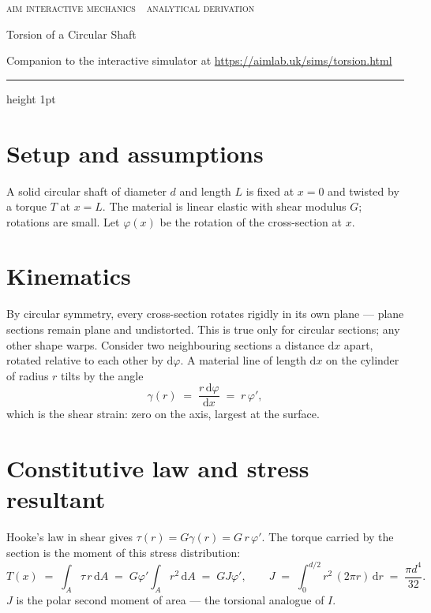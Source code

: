 \documentclass[10pt,a4paper]{article}
\begin{document}
{\footnotesize\textcolor{celdark}{\textsc{aim interactive mechanics \,\textperiodcentered\, analytical derivation}}}

{\LARGE Torsion of a Circular Shaft}

\textcolor{celdark}{\small Companion to the interactive simulator at
\url{https://aimlab.uk/sims/torsion.html}}

\medskip
{\color{celline}\hrule height 1pt}

\section*{Setup and assumptions}
A solid circular shaft of diameter $d$ and length $L$ is fixed at $x = 0$ and
twisted by a torque $T$ at $x = L$. The material is linear elastic with shear
modulus $G$; rotations are small. Let $\varphi(x)$ be the rotation of the
cross-section at $x$.

\section*{Kinematics}
By circular symmetry, every cross-section rotates rigidly in its own plane ---
plane sections remain plane and undistorted. This is true only for circular sections;
any other shape warps. Consider two neighbouring sections a distance
$\mathrm{d}x$ apart, rotated relative to each other by $\mathrm{d}\varphi$.
A material line of length $\mathrm{d}x$ on the cylinder of radius $r$ tilts by
the angle
\begin{equation}
\gamma(r) \;=\; \frac{r \,\mathrm{d}\varphi}{\mathrm{d}x} \;=\; r\,\varphi' ,
\end{equation}
which is the shear strain: zero on the axis, largest at the surface.

\section*{Constitutive law and stress resultant}
Hooke's law in shear gives $\tau(r) = G\gamma(r) = G\,r\,\varphi'$. The torque
carried by the section is the moment of this stress distribution:
\begin{equation}
T(x) \;=\; \int_A \tau\, r \,\mathrm{d}A
\;=\; G\varphi' \int_A r^2 \,\mathrm{d}A
\;=\; G J \varphi',
\qquad
J \;=\; \int_0^{d/2} r^2 \,(2\pi r)\,\mathrm{d}r \;=\; \frac{\pi d^4}{32}.
\end{equation}
$J$ is the polar second moment of area --- the torsional analogue of $I$.
\end{document}
